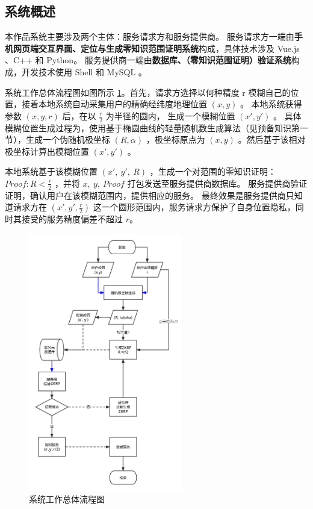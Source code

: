 \documentclass[zihao=-4]{ctexart}
\begin{document}
\subsection{系统概述}
本作品系统主要涉及两个主体：服务请求方和服务提供商。
服务请求方一端由\textbf{手机网页端交互界面、定位与生成零知识范围证明系统}构成，具体技术涉及 Vue.js 、C++ 和 Python。
服务提供商一端由\textbf{数据库、（零知识范围证明）验证系统}构成，开发技术使用 Shell 和 MySQL 。
\par
系统工作总体流程图如图所示 \ref{flowchart}。首先，请求方选择以何种精度 r 模糊自己的位置，接着本地系统自动采集用户的精确经纬度地理位置 $(x, y)$ 。
本地系统获得参数 $(x, y, r)$ 后，在以 $\frac{r}{2}$ 为半径的圆内， 生成一个模糊位置 $(x',y')$ 。
具体模糊位置生成过程为，使用基于椭圆曲线的轻量随机数生成算法（见预备知识第一节），生成一个伪随机极坐标 $(R, \alpha)$ ，极坐标原点为 $(x,y)$ 。然后基于该相对极坐标计算出模糊位置 $(x',y')$ 。
\par
本地系统基于该模糊位置 $(x',\ y',\ R)$ ，生成一个对范围的零知识证明：$Proof: R<\frac{r}{2}$ ，并将 $x,\ y,\ Proof$ 打包发送至服务提供商数据库。
服务提供商验证证明，确认用户在该模糊范围内，提供相应的服务。
最终效果是服务提供商只知道请求方在 $(x',y',\frac{r}{2})$ 这一个圆形范围内，服务请求方保护了自身位置隐私，同时其接受的服务精度偏差不超过 $r$。
\begin{figure}[H] %
    \centering %
    \includegraphics[width=0.6\textwidth]{系统工作流程图.jpg} %
    \caption{系统工作总体流程图} %
    \label{flowchart} %
\end{figure}
\end{document}
